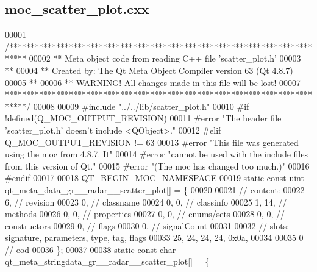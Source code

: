 \subsection{moc\+\_\+scatter\+\_\+plot.\+cxx}
\label{moc__scatter__plot_8cxx_source}

\begin{DoxyCode}
00001 \textcolor{comment}{/****************************************************************************}
00002 \textcolor{comment}{** Meta object code from reading C++ file 'scatter\_plot.h'}
00003 \textcolor{comment}{**}
00004 \textcolor{comment}{** Created by: The Qt Meta Object Compiler version 63 (Qt 4.8.7)}
00005 \textcolor{comment}{**}
00006 \textcolor{comment}{** WARNING! All changes made in this file will be lost!}
00007 \textcolor{comment}{*****************************************************************************/}
00008 
00009 \textcolor{preprocessor}{#include "../../lib/scatter\_plot.h"}
00010 \textcolor{preprocessor}{#if !defined(Q\_MOC\_OUTPUT\_REVISION)}
00011 \textcolor{preprocessor}{#error "The header file 'scatter\_plot.h' doesn't include <QObject>."}
00012 \textcolor{preprocessor}{#elif Q\_MOC\_OUTPUT\_REVISION != 63}
00013 \textcolor{preprocessor}{#error "This file was generated using the moc from 4.8.7. It"}
00014 \textcolor{preprocessor}{#error "cannot be used with the include files from this version of Qt."}
00015 \textcolor{preprocessor}{#error "(The moc has changed too much.)"}
00016 \textcolor{preprocessor}{#endif}
00017 
00018 QT\_BEGIN\_MOC\_NAMESPACE
00019 \textcolor{keyword}{static} \textcolor{keyword}{const} uint qt_meta_data_gr__radar__scatter_plot[] = \{
00020 
00021  \textcolor{comment}{// content:}
00022        6,       \textcolor{comment}{// revision}
00023        0,       \textcolor{comment}{// classname}
00024        0,    0, \textcolor{comment}{// classinfo}
00025        1,   14, \textcolor{comment}{// methods}
00026        0,    0, \textcolor{comment}{// properties}
00027        0,    0, \textcolor{comment}{// enums/sets}
00028        0,    0, \textcolor{comment}{// constructors}
00029        0,       \textcolor{comment}{// flags}
00030        0,       \textcolor{comment}{// signalCount}
00031 
00032  \textcolor{comment}{// slots: signature, parameters, type, tag, flags}
00033       25,   24,   24,   24, 0x0a,
00034 
00035        0        \textcolor{comment}{// eod}
00036 \};
00037 
00038 \textcolor{keyword}{static} \textcolor{keyword}{const} \textcolor{keywordtype}{char} qt_meta_stringdata_gr__radar__scatter_plot[] = \{

\end{DoxyCode}
